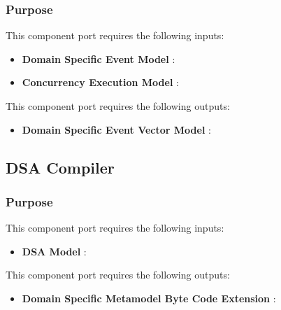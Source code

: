 \documentclass{gemoc} %
\begin{document}

\subsubsection{Purpose}

This component port requires the following inputs:
\begin{itemize}
  \item \textbf{Domain Specific Event Model} :
  \item \textbf{Concurrency Execution Model} :
\end{itemize}

This component port requires the following outputs:
\begin{itemize}
  \item \textbf{Domain Specific Event Vector Model} :
\end{itemize}

\subsection{DSA Compiler}


\subsubsection{Purpose}

This component port requires the following inputs:
\begin{itemize}
  \item \textbf{DSA Model} :
\end{itemize}

This component port requires the following outputs:
\begin{itemize}
  \item \textbf{Domain Specific Metamodel Byte Code Extension} :
\end{itemize}
\end{document}
